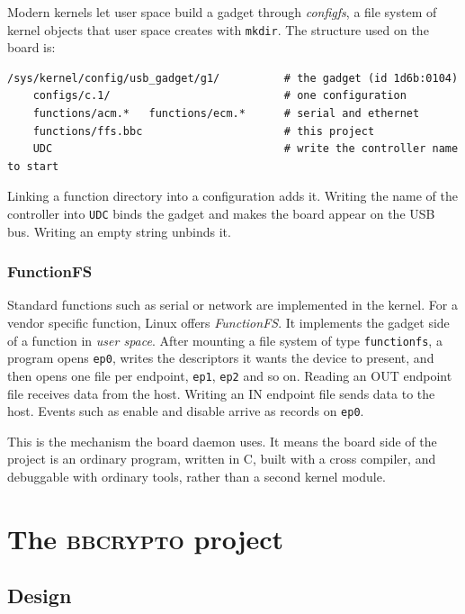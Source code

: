 \documentclass[11pt,a4paper,oneside]{report}
\newcommand{\code}[1]{\texttt{\small #1}}
\newcommand{\proj}{\textsc{bbcrypto}}
\begin{document}
Modern kernels let user space build a gadget through \emph{configfs}, a file system of kernel objects that user space creates with \code{mkdir}. The structure used on the board is:

\begin{lstlisting}[style=shell]
/sys/kernel/config/usb_gadget/g1/          # the gadget (id 1d6b:0104)
    configs/c.1/                           # one configuration
    functions/acm.*   functions/ecm.*      # serial and ethernet
    functions/ffs.bbc                      # this project
    UDC                                    # write the controller name to start
\end{lstlisting}

Linking a function directory into a configuration adds it. Writing the name of the controller into \code{UDC} binds the gadget and makes the board appear on the USB bus. Writing an empty string unbinds it.

\section{FunctionFS}

Standard functions such as serial or network are implemented in the kernel. For a vendor specific function, Linux offers \emph{FunctionFS}. It implements the gadget side of a function in \emph{user space}. After mounting a file system of type \code{functionfs}, a program opens \code{ep0}, writes the descriptors it wants the device to present, and then opens one file per endpoint, \code{ep1}, \code{ep2} and so on. Reading an OUT endpoint file receives data from the host. Writing an IN endpoint file sends data to the host. Events such as enable and disable arrive as records on \code{ep0}.

This is the mechanism the board daemon uses. It means the board side of the project is an ordinary program, written in C, built with a cross compiler, and debuggable with ordinary tools, rather than a second kernel module.



\part{The \proj{} project}

\chapter{Design}\label{ch:design}
\end{document}
